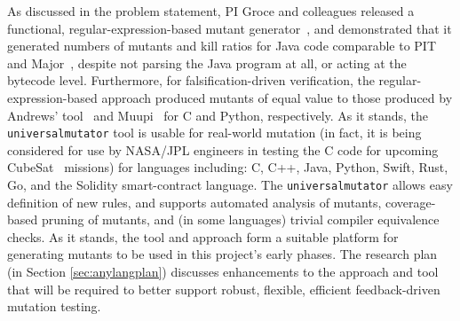 As discussed in the problem statement, PI Groce and colleagues
released a functional, regular-expression-based mutant
generator~\cite{regexpMut,universalmutator}, and demonstrated that it
generated numbers of mutants and kill ratios for Java code comparable
to PIT~\cite{pittest} and Major~\cite{Major}, despite not parsing the
Java program at all, or acting at the bytecode level.  Furthermore,
for falsification-driven verification, the regular-expression-based
approach produced mutants of equal value to those produced by Andrews'
tool~\cite{mutant} and Muupi~\cite{muupi} for C and Python,
respectively.  As it stands, the {\tt universalmutator} tool is
usable for real-world mutation (in fact, it is being considered for
use by NASA/JPL engineers in testing the C code for upcoming CubeSat~\cite{CubeSat}
missions) for languages including: C, C++, Java, Python, Swift, Rust,
Go, and the Solidity smart-contract language.  The {\tt universalmutator} allows easy definition of new rules, and supports
automated analysis of mutants, coverage-based pruning of mutants, and
(in some languages) trivial compiler equivalence~\cite{TCE} checks.
As it stands, the tool and approach form a suitable platform for
generating mutants to be used in this project's early phases.  The
research plan (in Section \ref{sec:anylangplan}) discusses enhancements to the approach and tool that will be required
to better support robust, flexible, efficient feedback-driven mutation
testing.
